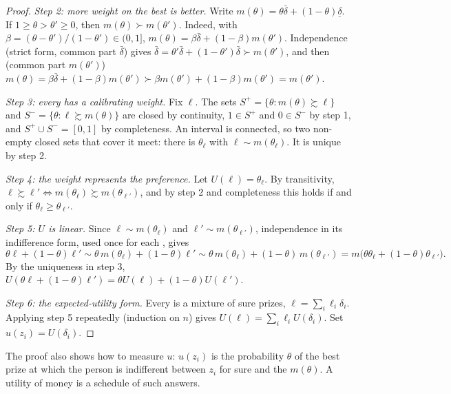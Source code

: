 \begin{proof}
\emph{Step 2: more weight on the best is better.} Write $m(\theta) = \theta\bar\delta +
(1-\theta)\underline\delta$. If $1 \ge \theta > \theta' \ge 0$, then $m(\theta) \succ m(\theta')$.
Indeed, with $\beta = (\theta - \theta')/(1 - \theta') \in (0, 1]$, $m(\theta) = \beta\bar\delta +
(1-\beta) m(\theta')$. Independence (strict form, common part $\bar\delta$) gives $\bar\delta =
\theta'\bar\delta + (1-\theta')\bar\delta \succ m(\theta')$, and then (common part $m(\theta')$)
$m(\theta) = \beta\bar\delta + (1-\beta)m(\theta') \succ \beta m(\theta') + (1-\beta) m(\theta') =
m(\theta')$.

\emph{Step 3: every  has a calibrating weight.} Fix $\ell$. The sets $S^{+} = \{\theta :
m(\theta) \succsim \ell\}$ and $S^{-} = \{\theta : \ell \succsim m(\theta)\}$ are closed by
continuity, $1 \in S^{+}$ and $0 \in S^{-}$ by step 1, and $S^{+} \cup S^{-} = [0,1]$ by
completeness. An interval is connected, so two non-empty closed sets that cover it meet: there is
$\theta_\ell$ with $\ell \sim m(\theta_\ell)$. It is unique by step 2.

\emph{Step 4: the weight represents the preference.} Let $U(\ell) = \theta_\ell$. By transitivity,
$\ell \succsim \ell' \iff m(\theta_\ell) \succsim m(\theta_{\ell'})$, and by step 2 and completeness
this holds if and only if $\theta_\ell \ge \theta_{\ell'}$.

\emph{Step 5: $U$ is linear.} Since $\ell \sim m(\theta_\ell)$ and $\ell' \sim m(\theta_{\ell'})$,
independence in its indifference form, used once for each , gives
\[
\theta\ell + (1-\theta)\ell' \sim \theta\, m(\theta_\ell) + (1-\theta)\ell' \sim \theta\, m(\theta_\ell)
+ (1-\theta)\, m(\theta_{\ell'}) = m\bigl(\theta\theta_\ell + (1-\theta)\theta_{\ell'}\bigr).
\]
By the uniqueness in step 3, $U(\theta\ell + (1-\theta)\ell') = \theta U(\ell) + (1-\theta)U(\ell')$.

\emph{Step 6: the expected-utility form.} Every  is a mixture of sure prizes, $\ell = \sum_i
\ell_i\delta_i$. Applying step 5 repeatedly (induction on $n$) gives $U(\ell) = \sum_i \ell_i
U(\delta_i)$. Set $u(z_i) = U(\delta_i)$.
\end{proof}

The proof also shows how to measure $u$: $u(z_i)$ is the probability $\theta$ of the best prize at
which the person is indifferent between $z_i$ for sure and the  $m(\theta)$. A utility of
money is a schedule of such answers.

